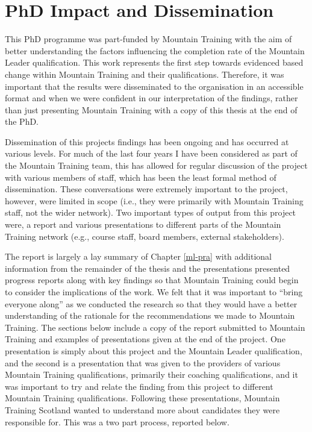 \documentclass[
  12pt,
  a4paper,
]{book}
\begin{document}
\hypertarget{impact-activities}{%
\chapter{PhD Impact and Dissemination}\label{impact-activities}}

This PhD programme was part-funded by Mountain Training with the aim of better understanding the factors influencing the completion rate of the Mountain Leader qualification. This work represents the first step towards evidenced based change within Mountain Training and their qualifications. Therefore, it was important that the results were disseminated to the organisation in an accessible format and when we were confident in our interpretation of the findings, rather than just presenting Mountain Training with a copy of this thesis at the end of the PhD.

Dissemination of this projects findings has been ongoing and has occurred at various levels. For much of the last four years I have been considered as part of the Mountain Training team, this has allowed for regular discussion of the project with various members of staff, which has been the least formal method of dissemination. These conversations were extremely important to the project, however, were limited in scope (i.e., they were primarily with Mountain Training staff, not the wider network). Two important types of output from this project were, a report and various presentations to different parts of the Mountain Training network (e.g., course staff, board members, external stakeholders).

The report is largely a lay summary of Chapter \ref{ml-pra} with additional information from the remainder of the thesis and the presentations presented progress reports along with key findings so that Mountain Training could begin to consider the implications of the work. We felt that it was important to ``bring everyone along'' as we conducted the research so that they would have a better understanding of the rationale for the recommendations we made to Mountain Training. The sections below include a copy of the report submitted to Mountain Training and examples of presentations given at the end of the project. One presentation is simply about this project and the Mountain Leader qualification, and the second is a presentation that was given to the providers of various Mountain Training qualifications, primarily their coaching qualifications, and it was important to try and relate the finding from this project to different Mountain Training qualifications. Following these presentations, Mountain Training Scotland wanted to understand more about candidates they were responsible for. This was a two part process, reported below.
\end{document}

